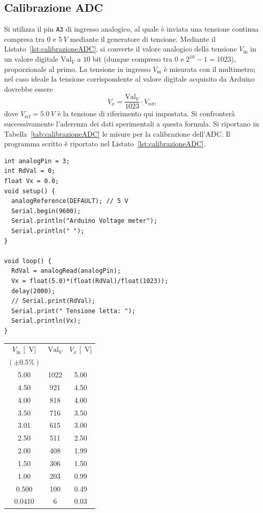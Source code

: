 \documentclass[10pt,oneside,a4paper]{article}
\begin{document}
\begin{multicols}{2}
\section{Calibrazione ADC}
Si utilizza il pin \texttt{A3} di ingresso analogico, al quale è inviata una tensione continua compresa tra $0$ e $5 \SI{}{V}$ mediante il generatore di tensione. Mediante il Listato~\ref{lst:calibrazioneADC}, si converte il valore analogico della tensione $V_\text{in}$ in un valore digitale $\text{Val}_V$ a $10$ bit (dunque compreso tra $0$ e $2^{10}-1 = 1023$), proporzionale al primo. La tensione in ingresso $V_\text{in}$ è misurata con il multimetro; nel caso ideale la tensione corrispondente al valore digitale acquisito da Arduino dovrebbe essere
\[
V_x = \frac{\text{Val}_V}{1023} \cdot V_\text{ref},
\]
dove $V_\text{ref} = \SI{5.0}{V}$ è la tensione di riferimento qui impostata. Si confronterà successivamente l'aderenza dei dati sperimentali a questa formula.
Si riportano in Tabella~\ref{tab:calibrazioneADC} le misure per la calibrazione dell'ADC. Il programma scritto è riportato nel Listato~\ref{lst:calibrazioneADC}. 

\begin{lstlisting}[style=CStyle, caption={Codice per la conversione analogico-digitale}, label=lst:calibrazioneADC]
int analogPin = 3;
int RdVal = 0;
float Vx = 0.0;
void setup() {
  analogReference(DEFAULT); // 5 V
  Serial.begin(9600);
  Serial.println("Arduino Voltage meter");
  Serial.println(" ");
}

void loop() {
  RdVal = analogRead(analogPin);
  Vx = float(5.0)*(float(RdVal)/float(1023));
  delay(2000);
  // Serial.print(RdVal);
  Serial.print(" Tensione letta: ");
  Serial.println(Vx);
}
\end{lstlisting}

\begin{center}
\label{tab:calibrazioneADC}
\begin{tabular}{c|c|c}
$V_\text{in}$ [\SI{}{V}] & $\text{Val}_V$ &  $V_x$ [\SI{}{V}] \\
$(\pm 0.5\%)$&&\\
\hline
5.00 & 1022 & 5.00 \\
4.50 & 921 & 4.50 \\
4.00 & 818 & 4.00 \\
3.50 & 716 & 3.50 \\
3.01 & 615 & 3.00 \\
2.50 & 511 & 2.50 \\
2.00 & 408 & 1.99 \\
1.50 & 306 & 1.50 \\ 
1.00 & 203 & 0.99 \\
0.500 & 100 & 0.49 \\
0.0410 & 6 & 0.03 \\
\hline
\end{tabular}
\end{center}


\end{multicols}
\end{document}
